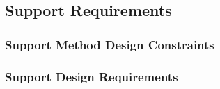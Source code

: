 \subsection{Support Requirements}

\subsubsection{Support Method Design Constraints}

\subsubsection{Support Design Requirements} 


%
%
%
%
%
%
